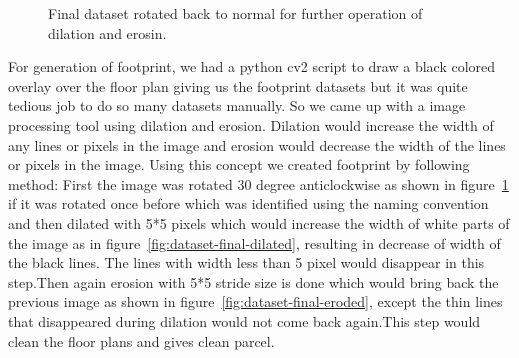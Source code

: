 \begin{figure}[h]
\begin{minipage}{.45\textwidth}
                    \caption{Final dataset rotated back to normal for further operation of dilation and erosin.}
                    \label{fig:dataset-final-rotated}
                \end{minipage}
            \end{figure}
            \break
            For generation of footprint, we had a python cv2 script to draw a black colored overlay over the floor plan giving us the footprint datasets but it was quite tedious job to do so many datasets manually. So we came up with a image processing tool using dilation and erosion. Dilation would increase the width of any lines or pixels in the image and erosion would decrease the width of the lines or pixels in the image.  Using this concept we created footprint by following method:
            First the image was rotated 30 degree anticlockwise as shown in figure~\ref{fig:dataset-final-rotated} if it was rotated once before which was identified using the naming convention and then dilated with 5*5 pixels which would increase the width of white parts of the image as in figure~\ref{fig:dataset-final-dilated}, resulting in decrease of width of the black lines. The lines with width less than 5 pixel would disappear in this step.Then again erosion with 5*5 stride size is done which would bring back the previous image as shown in figure~\ref{fig:dataset-final-eroded}, except the thin lines that disappeared during dilation would not come back again.This step would clean the floor plans and gives clean parcel.\\
